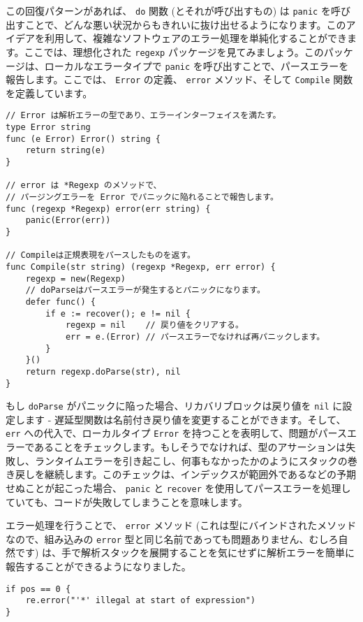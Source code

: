 \documentclass{jsarticle}
\begin{document}
この回復パターンがあれば、 \texttt{do} 関数 (とそれが呼び出すもの) は
\texttt{panic}
を呼び出すことで、どんな悪い状況からもきれいに抜け出せるようになります。このアイデアを利用して、複雑なソフトウェアのエラー処理を単純化することができます。ここでは、理想化された
\texttt{regexp}
パッケージを見てみましょう。このパッケージは、ローカルなエラータイプで
\texttt{panic} を呼び出すことで、パースエラーを報告します。ここでは、
\texttt{Error} の定義、 \texttt{error} メソッド、そして \texttt{Compile}
関数を定義しています。

\begin{lstlisting}[numbers=none]
// Error は解析エラーの型であり、エラーインターフェイスを満たす。
type Error string
func (e Error) Error() string {
    return string(e)
}

// error は *Regexp のメソッドで、
// パージングエラーを Error でパニックに陥れることで報告します。
func (regexp *Regexp) error(err string) {
    panic(Error(err))
}

// Compileは正規表現をパースしたものを返す。
func Compile(str string) (regexp *Regexp, err error) {
    regexp = new(Regexp)
    // doParseはパースエラーが発生するとパニックになります。
    defer func() {
        if e := recover(); e != nil {
            regexp = nil    // 戻り値をクリアする。
            err = e.(Error) // パースエラーでなければ再パニックします。
        }
    }()
    return regexp.doParse(str), nil
}
\end{lstlisting}

もし \texttt{doParse} がパニックに陥った場合、リカバリブロックは戻り値を
\texttt{nil} に設定します -
遅延型関数は名前付き戻り値を変更することができます。そして、
\texttt{err} への代入で、ローカルタイプ \texttt{Error}
を持つことを表明して、問題がパースエラーであることをチェックします。もしそうでなければ、型のアサーションは失敗し、ランタイムエラーを引き起こし、何事もなかったかのようにスタックの巻き戻しを継続します。このチェックは、インデックスが範囲外であるなどの予期せぬことが起こった場合、
\texttt{panic} と \texttt{recover}
を使用してパースエラーを処理していても、コードが失敗してしまうことを意味します。

エラー処理を行うことで、 \texttt{error} メソッド
(これは型にバインドされたメソッドなので、組み込みの \texttt{error}
型と同じ名前であっても問題ありません、むしろ自然です)
は、手で解析スタックを展開することを気にせずに解析エラーを簡単に報告することができるようになりました。

\begin{lstlisting}[numbers=none]
if pos == 0 {
    re.error("'*' illegal at start of expression")
}
\end{lstlisting}
\end{document}
